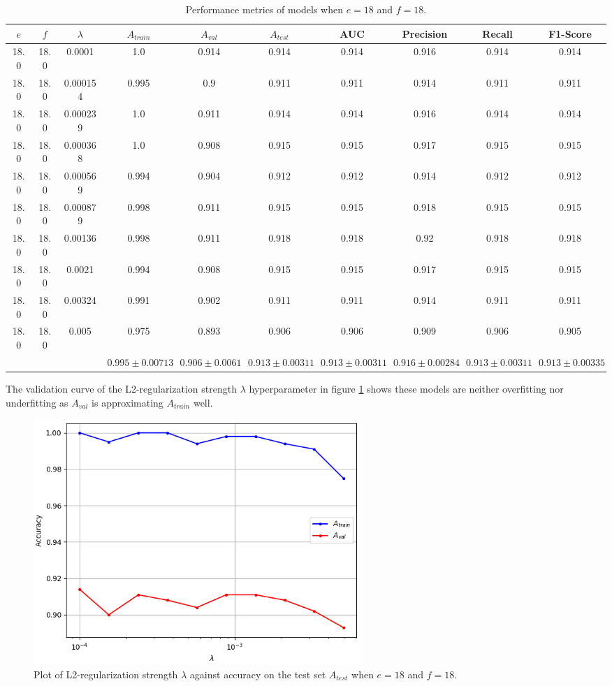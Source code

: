 \begin{table}[ht]
\centering
\begin{tabular}{ |c|c|c|c|c|c|c|c|c|c| }
\hline
$e$ & $f$ & $\lambda$ & $A_{train}$ & $A_{val}$ & $A_{test}$ & AUC & Precision & Recall & F1-Score \\
\hline
18.0 & 18.0 & 0.0001 & 1.0 & 0.914 & 0.914 & 0.914 & 0.916 & 0.914 & 0.914 \\
18.0 & 18.0 & 0.000154 & 0.995 & 0.9 & 0.911 & 0.911 & 0.914 & 0.911 & 0.911 \\
18.0 & 18.0 & 0.000239 & 1.0 & 0.911 & 0.914 & 0.914 & 0.916 & 0.914 & 0.914 \\
18.0 & 18.0 & 0.000368 & 1.0 & 0.908 & 0.915 & 0.915 & 0.917 & 0.915 & 0.915 \\
18.0 & 18.0 & 0.000569 & 0.994 & 0.904 & 0.912 & 0.912 & 0.914 & 0.912 & 0.912 \\
18.0 & 18.0 & 0.000879 & 0.998 & 0.911 & 0.915 & 0.915 & 0.918 & 0.915 & 0.915 \\
18.0 & 18.0 & 0.00136 & 0.998 & 0.911 & 0.918 & 0.918 & 0.92 & 0.918 & 0.918 \\
18.0 & 18.0 & 0.0021 & 0.994 & 0.908 & 0.915 & 0.915 & 0.917 & 0.915 & 0.915 \\
18.0 & 18.0 & 0.00324 & 0.991 & 0.902 & 0.911 & 0.911 & 0.914 & 0.911 & 0.911 \\
18.0 & 18.0 & 0.005 & 0.975 & 0.893 & 0.906 & 0.906 & 0.909 & 0.906 & 0.905 \\
\hline
 & & & $0.995\pm0.00713$ & $0.906\pm0.0061$ & $0.913\pm0.00311$ & $0.913\pm0.00311$ & $0.916\pm0.00284$ & $0.913\pm0.00311$ & $0.913\pm0.00335$ \\
\hline
\end{tabular}
\caption{Performance metrics of models when $e = 18$ and $f = 18$.}
\label{table:vgg16_total}
\end{table}

The validation curve of the L2-regularization strength $\lambda$ hyperparameter in figure \ref{fig:vgg16_total_lambda} shows these models are neither overfitting nor underfitting as $A_{val}$ is approximating $A_{train}$ well.

\begin{figure}[ht]
    \centering
    \includegraphics[width=0.6\textwidth]{figs/vgg16_total_lambda.png}
    \caption{Plot of L2-regularization strength $\lambda$ against accuracy on the test set $A_{test}$ when $e = 18$ and $f = 18$.}
    \label{fig:vgg16_total_lambda}
\end{figure}

